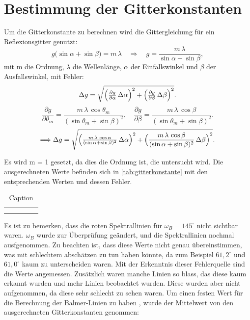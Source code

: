 \section{Bestimmung der Gitterkonstanten}
Um die Gitterkonstante zu berechnen wird die Gittergleichung für ein Reflexionsgitter genutzt:
\begin{equation}
  g\bigl(\sin\alpha + \sin\beta\bigr) = m\,\lambda
  \quad\Longrightarrow\quad
  g = \frac{m\,\lambda}{\sin\alpha + \sin\beta},
  \label{Gittergleichung}
\end{equation}
mit m die Ordnung, $\lambda$ die Wellenlänge, $\alpha$ der Einfallswinkel und $\beta$ der Ausfallswinkel, mit Fehler:
\begin{equation}
  \Delta g
  = \sqrt{
    \Bigl(\tfrac{\partial g}{\partial\alpha}\,\Delta\alpha\Bigr)^{2}
   +\Bigl(\tfrac{\partial g}{\partial\beta}\,\Delta\beta\Bigr)^{2}
  }.
  \label{Gitterfgleichung fehler}
\end{equation}
\begin{equation}
  \frac{\partial g}{\partial\theta_m}
  = \frac{m\,\lambda\,\cos\theta_m}{(\sin\theta_m + \sin\beta)^{2}},
  \quad
  \frac{\partial g}{\partial\beta}
  = \frac{m\,\lambda\,\cos\beta}{(\sin\theta_m + \sin\beta)^{2}}.
\end{equation}
\begin{equation}
    \Longrightarrow \Delta g = \sqrt{\Bigl(\tfrac{m\,\lambda\,\cos{\alpha}}{(\sin{\alpha}+\sin{\beta})^2}\,\Delta\alpha\Bigr)^2 + \Bigl(\frac{m\,\lambda\,\cos{\beta}}{(\sin{\alpha} + \sin{\beta})^2}\,\Delta\beta\Bigr)^2}.
\end{equation}

Es wird m = 1 gesetzt, da dies die Ordnung ist, die untersucht wird.
Die
 ausgerechneten Werte befinden sich in \cref{tab:gitterkonstante} mit den entsprechenden  Werten und dessen Fehler.
\begin{table}[htbp]
    \centering
    \begin{tabular}{|c|c|c|c|c|}
        
         &  \\
         & 
    \end{tabular}
    \caption{Caption}
    \label{tab:my_label}
\end{table}
Es ist zu bemerken, dass die roten Spektrallinien für $\omega_B = 145^\circ$ nicht sichtbar waren. $\omega_B$ wurde zur Überprüfung geändert, und die Spektrallinien nochmal ausfgenommen. 
Zu beachten ist, dass diese Werte nicht genau übereinstimmen, was mit schlechtem abschätzen zu tun haben könnte, da zum Beispiel $61,2^\circ$ und $61,0^\circ$ kaum zu unterscheiden waren.
Mit der Erkenntnis dieser Fehlerquelle sind die Werte angemessen.
Zusätzlich waren manche Linien so blass, das diese kaum erkannt wurden und mehr Linien beobachtet wurden. 
Diese wurden aber nicht aufgenommen, da diese sehr schlecht zu sehen waren. 
Um einen festen Wert für die Berechnung der Balmer-Linien zu haben , wurde der Mittelwert von den ausgerechneten Gitterkonstanten genommen:


